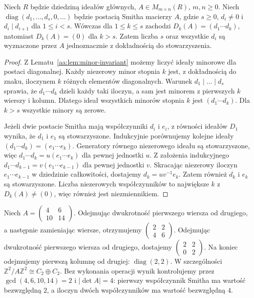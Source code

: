 \begin{twierdzenie}
\label{aa:tw:smith-uniqueness}
Niech $R$ będzie dziedziną ideałów głównych,
$A\in M_{m\times n}(R)$, $m,n\ge0$.
Niech $\operatorname{diag}(d_1,\dots,d_s,0,\dots)$ będzie
postacią Smitha macierzy $A$, gdzie $s\ge0$, $d_i\ne0$
i $d_i\mid d_{i+1}$ dla $1\le i<s$. Wówczas dla $1\le k\le s$
zachodzi $D_k(A)=(d_1\cdots d_k)$, natomiast
$D_k(A)=(0)$ dla $k>s$. Zatem liczba $s$ oraz
wszystkie $d_i$ są wyznaczone przez $A$ jednoznacznie
z dokładnością do stowarzyszenia.
\end{twierdzenie}
\begin{proof}
Z Lematu~\ref{aa:lem:minor-invariant} możemy liczyć
ideały minorowe dla postaci diagonalnej. Każdy niezerowy
minor stopnia $k$ jest, z dokładnością do znaku,
iloczynem $k$ różnych elementów diagonalnych.
Warunek $d_1\mid\dots\mid d_s$ sprawia, że
$d_1\cdots d_k$ dzieli każdy taki iloczyn, a sam
jest minorem z pierwszych $k$ wierszy i kolumn.
Dlatego ideał wszystkich minorów stopnia $k$ jest
$(d_1\cdots d_k)$. Dla $k>s$ wszystkie minory są zerowe.

Jeżeli dwie postacie Smitha mają współczynniki $d_i$
i $e_i$, z równości ideałów $D_1$ wynika, że $d_1$
i $e_1$ są stowarzyszone. Indukcyjnie porównujemy kolejne ideały
$(d_1\cdots d_k)=(e_1\cdots e_k)$. Generatory
równego niezerowego ideału są stowarzyszone, więc
$d_1\cdots d_k=u(e_1\cdots e_k)$ dla pewnej jednostki $u$.
Z założenia indukcyjnego
$d_1\cdots d_{k-1}=v(e_1\cdots e_{k-1})$
dla pewnej jednostki $v$. Skracając niezerowy iloczyn
$e_1\cdots e_{k-1}$ w dziedzinie całkowitości,
dostajemy $d_k=uv^{-1}e_k$. Zatem również $d_k$
i $e_k$ są stowarzyszone. Liczba
niezerowych współczynników to największe $k$
z $D_k(A)\ne(0)$, więc również jest niezmiennikiem.
\end{proof}

\begin{przyklad}
\label{aa:prz:smith-integer-steps}
Niech $A=\begin{pmatrix}4&6\\10&14\end{pmatrix}$.
Odejmując dwukrotność pierwszego wiersza od drugiego,
a następnie zamieniając wiersze, otrzymujemy
$\begin{pmatrix}2&2\\4&6\end{pmatrix}$.
Odejmując dwukrotność pierwszego wiersza od drugiego,
dostajemy $\begin{pmatrix}2&2\\0&2\end{pmatrix}$.
Na koniec odejmujemy pierwszą kolumnę od drugiej:
$\operatorname{diag}(2,2)$. W szczególności
$\mathbb Z^2/A\mathbb Z^2\cong C_2\oplus C_2$.
Bez wykonania operacji wynik kontrolujemy przez
$\gcd(4,6,10,14)=2$ i $|\det A|=4$:
pierwszy współczynnik Smitha ma wartość bezwzględną $2$,
a iloczyn dwóch współczynników ma wartość bezwzględną $4$.
\end{przyklad}

